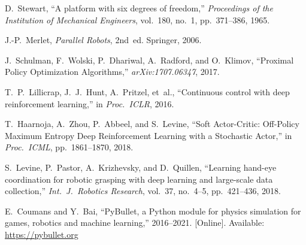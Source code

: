 \documentclass[conference]{IEEEtran}
\begin{document}

\begin{thebibliography}{00}

D.~Stewart, ``A platform with six degrees of freedom,'' \emph{Proceedings of the Institution of Mechanical Engineers}, vol.~180, no.~1, pp.~371--386, 1965.

J.-P.~Merlet, \emph{Parallel Robots}, 2nd~ed. Springer, 2006.

J.~Schulman, F.~Wolski, P.~Dhariwal, A.~Radford, and O.~Klimov, ``Proximal Policy Optimization Algorithms,'' \emph{arXiv:1707.06347}, 2017.

T.~P.~Lillicrap, J.~J.~Hunt, A.~Pritzel, et~al., ``Continuous control with deep reinforcement learning,'' in \emph{Proc.\ ICLR}, 2016.

T.~Haarnoja, A.~Zhou, P.~Abbeel, and S.~Levine, ``Soft Actor-Critic: Off-Policy Maximum Entropy Deep Reinforcement Learning with a Stochastic Actor,'' in \emph{Proc.\ ICML}, pp.~1861--1870, 2018.

S.~Levine, P.~Pastor, A.~Krizhevsky, and D.~Quillen, ``Learning hand-eye coordination for robotic grasping with deep learning and large-scale data collection,'' \emph{Int.\ J.\ Robotics Research}, vol.~37, no.~4--5, pp.~421--436, 2018. %

E.~Coumans and Y.~Bai, ``PyBullet, a Python module for physics simulation for games, robotics and machine learning,'' 2016--2021. [Online]. Available: \url{https://pybullet.org}

\end{thebibliography}
\end{document}

